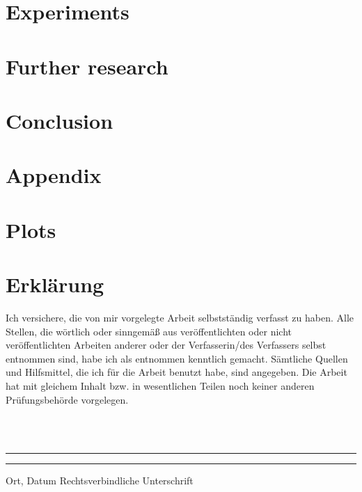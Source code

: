 \documentclass[twoside,11pt]{article}
\begin{document}

\section{Experiments}
\label{sec:experiments}


\section{Further research}
\label{sec:further_research}

\section{Conclusion}

\renewcommand{\appendixpagename}{}
\begin{appendices}
  \section*{Appendix}

  \section{Plots}

\end{appendices}



\newpage
\section*{Erklärung}
Ich versichere, die von mir vorgelegte Arbeit
selbstst\"andig verfasst zu haben.
Alle Stellen, die w\"ortlich oder sinngem\"a{\ss} aus
ver\"offentlichten oder nicht ver\"offentlichten Arbeiten
anderer oder der Verfasserin/des Verfassers selbst
entnommen sind, habe ich als entnommen kenntlich gemacht.
S\"amtliche Quellen und Hilfsmittel, die ich für die Arbeit
benutzt habe, sind angegeben.
Die Arbeit hat mit gleichem Inhalt bzw. in wesentlichen
Teilen noch keiner anderen Pr\"ufungsbeh\"orde vorgelegen.

~\\
~\\
\noindent
\rule{0.35\textwidth}{0.4pt}
\hspace*{3cm}
\rule{0.45\textwidth}{0.4pt}
\newline
Ort, Datum	\hspace*{6.3cm}	Rechtsverbindliche Unterschrift
\end{document}
